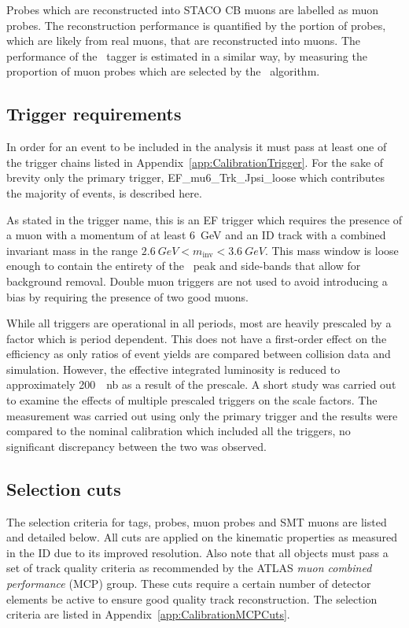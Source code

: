 Probes which are reconstructed into STACO CB muons are labelled as muon probes. The reconstruction performance is quantified by the portion of probes, which are likely from real muons, that are reconstructed into muons. The performance of the \xsm\ tagger is estimated in a similar way, by measuring the proportion of muon probes which are selected by the \xsm\ algorithm.

\subsection{Trigger requirements}\label{sec:CalibrationTriggerRequirement}

In order for an event to be included in the analysis it must pass at least one of the trigger chains listed in Appendix~\ref{app:CalibrationTrigger}. For the sake of brevity only the primary trigger, EF\_mu6\_Trk\_Jpsi\_loose which contributes the majority of events, is described here.

As stated in the trigger name, this is an EF trigger which requires the presence of a muon with a momentum of at least \SI{6}{GeV} and an ID track with a combined invariant mass in the range $\SI{2.6}{GeV}<m_{\textrm{inv}}<\SI{3.6}{GeV}$. This mass window is loose enough to   contain the entirety of the \jpsi\ peak and side-bands that allow for background removal. Double muon triggers are not used to avoid introducing a bias by requiring the presence of two good muons. 

While all triggers are operational in all periods, most are heavily prescaled by a factor which is period dependent. This does not have a first-order effect on the efficiency as only ratios of event yields are compared between collision data and simulation. However, the effective integrated luminosity is reduced to approximately \SI{200}{\per\nano\barn} as a result of the prescale. A short study was carried out to examine the effects of multiple prescaled triggers on the scale factors. The measurement was carried out using only the primary trigger and the results were compared to the nominal calibration which included all the triggers, no significant discrepancy between the two was observed.

\subsection{Selection cuts}\label{sec:CalibrationSelectionCuts}

The selection criteria for tags, probes, muon probes and SMT muons are listed and detailed below. All cuts are applied on the kinematic properties as measured in the ID due to its improved resolution. Also note that all objects must pass a set of track quality criteria as recommended by the ATLAS \emph{muon combined performance} (MCP) group. These cuts require a certain number of detector elements be active to ensure good quality track reconstruction. The selection criteria are listed in Appendix~\ref{app:CalibrationMCPCuts}.

